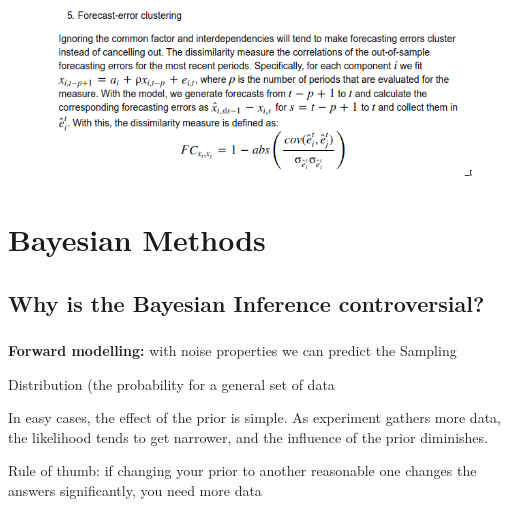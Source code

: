 \documentclass[c, dvipsnames]{beamer}  %
\begin{document}
\begin{frame}[shrink=5]
\frametitle{\insertsection} 
\framesubtitle{\insertsubsection}


\begin{figure}
	\centering
	\includegraphics[width=0.7\linewidth]{screenshot043}
	\label{fig:screenshot029}
\end{figure}


\end{frame}








\section{Bayesian Methods}





\subsection{Why is the Bayesian Inference controversial?}

\begin{frame}[shrink=5]
\frametitle{\insertsection} 

\textbf{Forward	modelling:	}   with
  noise	
properties	
  we	
 can	 predict	
  the	Sampling	
  
Distribution
   (the probability	
  for	
  a	
 general	
  set	
  of	
 data


In	
  easy	
  cases,	
  the	
  effect	
  of	
  the	
  prior	
  is	
  simple. As	
  experiment	
  gathers	
  more	
  data,	
  the	
  likelihood	
  tends	
  to	
  get	
  narrower,	
  and	
  the	
  influence	
  of	
  the	
  prior	
  diminishes.	
  

Rule	
  of	
  thumb:	
  if	
  changing	
  your	
  prior	
  to	
  another	
  reasonable	
 one	
  changes	
  the	
  answers	
  significantly,	
  you	
  need	
  more	
  data	
  



\end{frame}
\end{document}
